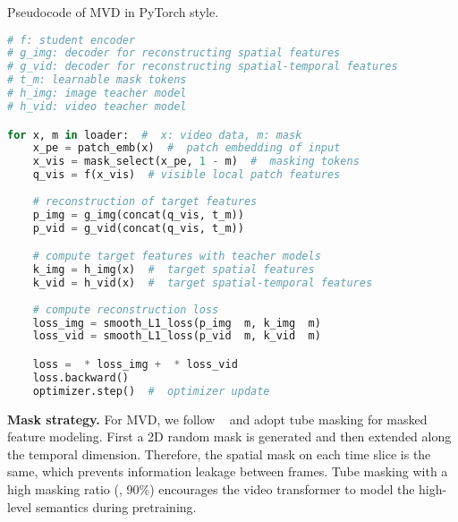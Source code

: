 \documentclass[10pt,twocolumn,letterpaper]{article}
\makeatletter
\let\@algcomment\relax
\newcommand\algcomment[1]{\def\@algcomment{\footnotesize#1}}
\makeatother
\begin{document}
\begin{algorithm}[t]
    \caption{Pseudocode of MVD in PyTorch style.}
    \label{alg:code}
    \algcomment{\fontsize{7.2pt}{0em}\selectfont
    \vspace{-2.em}
    }

\begin{lstlisting}[language=python, mathescape=true]
# f: student encoder
# g_img: decoder for reconstructing spatial features
# g_vid: decoder for reconstructing spatial-temporal features
# t_m: learnable mask tokens
# h_img: image teacher model
# h_vid: video teacher model

for x, m in loader:  #  x: video data, m: mask 
    x_pe = patch_emb(x)  #  patch embedding of input
    x_vis = mask_select(x_pe, 1 - m)  #  masking tokens
    q_vis = f(x_vis)  # visible local patch features
    
    # reconstruction of target features
    p_img = g_img(concat(q_vis, t_m))
    p_vid = g_vid(concat(q_vis, t_m))

    # compute target features with teacher models
    k_img = h_img(x)  #  target spatial features
    k_vid = h_vid(x)  #  target spatial-temporal features
   
    # compute reconstruction loss
    loss_img = smooth_L1_loss(p_img  m, k_img  m)
    loss_vid = smooth_L1_loss(p_vid  m, k_vid  m)

    loss =  * loss_img +  * loss_vid
    loss.backward()
    optimizer.step()  #  optimizer update


\end{lstlisting}
\end{algorithm}

\vspace{0.05in}
\noindent \textbf{Mask strategy.} For MVD, we follow ~\cite{tong2022videomae} and adopt tube masking for masked feature modeling. First a 2D random mask is generated and then extended along the temporal dimension. Therefore, the spatial mask on each time slice is the same, which prevents information leakage between frames. Tube masking with a high masking ratio (\eg, 90\%) encourages the video transformer to model the high-level semantics during pretraining.
\end{document}
